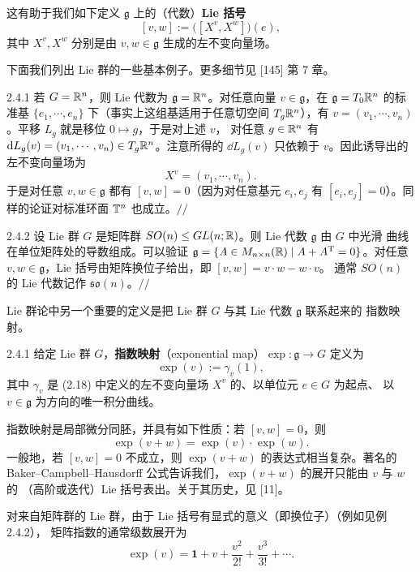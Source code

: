 这有助于我们如下定义 $\mathfrak{g}$ 上的（代数）\textbf{Lie 括号}
\[
  [v,w]:=\big([X^v,X^w]\big)(e),
\]
其中 $X^v,X^w$ 分别是由 $v,w\in\mathfrak{g}$ 生成的左不变向量场。

下面我们列出 Lie 群的一些基本例子。更多细节见 [145] 第 7 章。

\begin{wexam}{2.4.1}
若 $G=\mathbb{R}^n$，则 Lie 代数为 $\mathfrak{g}=\mathbb{R}^n$。对任意向量 $v\in\mathfrak{g}$，在
$\mathfrak{g}=T_0\mathbb{R}^n$ 的标准基 $\{e_1,\cdots,e_n\}$ 下（事实上这组基适用于任意切空间
$T_g\mathbb{R}^n$），有 $v=(v_1,\cdots,v_n)$。平移 $L_g$ 就是移位 $0\mapsto g$，于是对上述 $v$，
对任意 $g\in\mathbb{R}^n$ 有 $\mathrm{d} L_g(v)=(v_1,\cdots,v_n)\in T_g\mathbb{R}^n$。注意所得的 $\dd L_g(v)$
只依赖于 $v$。因此诱导出的左不变向量场为
\begin{equation}
  X^v=(v_1,\cdots,v_n).
  \tag{2.19}
\end{equation}
于是对任意 $v,w\in\mathfrak{g}$ 都有 $[v,w]=0$（因为对任意基元 $e_i,e_j$ 有
$[e_i,e_j]=0$）。同样的论证对标准环面 $\mathbb{T}^n$ 也成立。\hfill$//$
\end{wexam}

\begin{wexam}{2.4.2}
设 Lie 群 $G$ 是矩阵群 $SO(n)\le GL(n;\mathbb{R})$。则 Lie 代数 $\mathfrak{g}$ 由 $G$ 中光滑
曲线在单位矩阵处的导数组成。可以验证
$\mathfrak{g}=\{A\in M_{n\times n}(\mathbb{R})\mid A+A^{\mathrm T}=0\}$。对任意
$v,w\in\mathfrak{g}$，Lie 括号由矩阵换位子给出，即 $[v,w]=v\cdot w-w\cdot v$。
通常 $SO(n)$ 的 Lie 代数记作 $\mathfrak{so}(n)$。\hfill$//$
\end{wexam}

Lie 群论中另一个重要的定义是把 Lie 群 $G$ 与其 Lie 代数 $\mathfrak{g}$ 联系起来的
指数映射。

\begin{wdefn}{2.4.1}
给定 Lie 群 $G$，\textbf{指数映射}（exponential map）$\exp:\mathfrak{g}\to G$ 定义为
\[
  \exp(v):=\gamma_v(1),
\]
其中 $\gamma_v$ 是 (2.18) 中定义的左不变向量场 $X^v$ 的、以单位元 $e\in G$ 为起点、
以 $v\in\mathfrak{g}$ 为方向的唯一积分曲线。
\end{wdefn}

指数映射是局部微分同胚，并具有如下性质：若 $[v,w]=0$，则
\[
  \exp(v+w)=\exp(v)\cdot\exp(w).
\]
一般地，若 $[v,w]=0$ 不成立，则 $\exp(v+w)$ 的表达式相当复杂。著名的
Baker--Campbell--Hausdorff 公式告诉我们，$\exp(v+w)$ 的展开只能由 $v$ 与 $w$ 的
（高阶或迭代）Lie 括号表出。关于其历史，见 [11]。

对来自矩阵群的 Lie 群，由于 Lie 括号有显式的意义（即换位子）（例如见例 2.4.2），
矩阵指数的通常级数展开为
\begin{equation}
  \exp(v)=\mathbf{1}+v+\frac{v^2}{2!}+\frac{v^3}{3!}+\cdots .
  \tag{2.20}
\end{equation}

